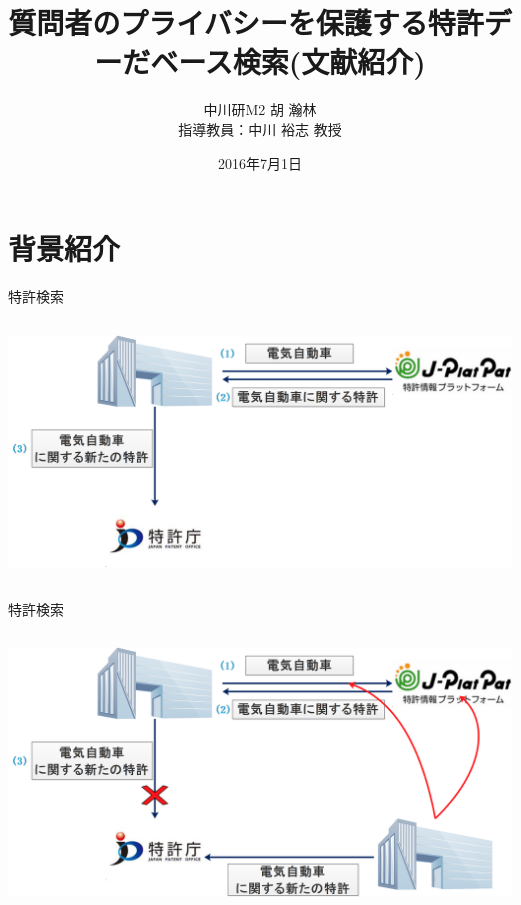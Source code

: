 \documentclass[14pt,xcolor=dvipsnames,table,dvipdfmx]{beamer}
\title{\bfseries 質問者のプライバシーを保護する特許デーだベース検索(文献紹介)}
\date{2016年7月1日}
\author{中川研M2 胡 瀚林 \\ 指導教員：中川 裕志 教授}
\begin{document}
\maketitle
\frame{\tableofcontents[hideallsubsections]}

\section{背景紹介}
\begin{frame}{特許検索}
\begin{columns}[t]
    \begin{column}{0.8\textwidth} %
      	\includegraphics[width=\columnwidth]{rk1.png}
    \end{column}
\end{columns}
\end{frame}

\begin{frame}{特許検索}
\begin{columns}[t]
    \begin{column}{0.8\textwidth} %
      	\includegraphics[width=\columnwidth]{rk2.png}
    \end{column}
\end{columns}
\end{frame}
\end{document}
